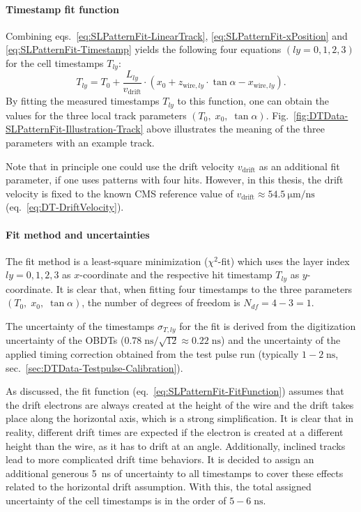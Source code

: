 \paragraph{Timestamp fit function}
Combining eqs.\ \ref{eq:SLPatternFit-LinearTrack}, \ref{eq:SLPatternFit-xPosition} and \ref{eq:SLPatternFit-Timestamp} yields the following four equations $(ly =0,1,2,3)$ for the cell timestamps $T_{ly}$:
\begin{equation}
    T_{ly} = T_0 + \frac{L_{ly}}{v_\text{drift}} \cdot \left( x_0 + z_{\text{wire},ly} \cdot \tan\alpha - x_{\text{wire},ly} \right).
    \label{eq:SLPatternFit-FitFunction}
\end{equation}
By fitting the measured timestamps $T_{ly}$ to this function, one can obtain the values for the three local track parameters $(T_0,\;x_0,\;\tan\alpha)$. Fig.\ \ref{fig:DTData-SLPatternFit-Illustration-Track} above illustrates the meaning of the three parameters with an example track.
\par Note that in principle one could use the drift velocity $v_\text{drift}$ as an additional fit parameter, if one uses patterns with four hits. However, in this thesis, the drift velocity is fixed to the known \ac{CMS} reference value of $v_\text{drift}\approx\SI{54.5}{\micro\meter/\nano\second}$ (eq.\ \ref{eq:DT-DriftVelocity}).
\paragraph{Fit method and uncertainties}
The fit method is a least-square minimization ($\chi^2$-fit) which uses the layer index $ly=0,1,2,3$ as $x$-coordinate and the respective hit timestamp $T_{ly}$ as $y$-coordinate. It is clear that, when fitting four timestamps to the three parameters $(T_0,\; x_0,\; \tan\alpha)$, the number of degrees of freedom is $N_{df}=4-3=1$.
\par The uncertainty of the timestamps $\sigma_{T,ly}$ for the fit is derived from the digitization uncertainty of the \acp{OBDT} ($0.78 \;\si{\nano\second}/\sqrt{12} \approx 0.22 \;\si{\nano\second}$) and the uncertainty of the applied timing correction obtained from the test pulse run (typically $1-2 \;\si{\nano\second}$, sec.\ \ref{sec:DTData-Testpulse-Calibration}).
\par As discussed, the fit function (eq.\ \ref{eq:SLPatternFit-FitFunction}) assumes that the drift electrons are always created at the height of the wire and the drift takes place along the horizontal axis, which is a strong simplification. It is clear that in reality, different drift times are expected if the electron is created at a different height than the wire, as it has to drift at an angle. Additionally, inclined tracks lead to more complicated drift time behaviors. It is decided to assign an additional generous \SI{5}{\nano\second} of uncertainty to all timestamps to cover these effects related to the horizontal drift assumption. With this, the total assigned uncertainty of the cell timestamps is in the order of $5-6 \;\si{\nano\second}$.
